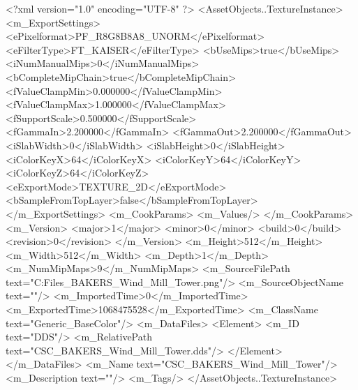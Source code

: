 <?xml version="1.0" encoding="UTF-8" ?>
<AssetObjects..TextureInstance>
	<m_ExportSettings>
		<ePixelformat>PF_R8G8B8A8_UNORM</ePixelformat>
		<eFilterType>FT_KAISER</eFilterType>
		<bUseMips>true</bUseMips>
		<iNumManualMips>0</iNumManualMips>
		<bCompleteMipChain>true</bCompleteMipChain>
		<fValueClampMin>0.000000</fValueClampMin>
		<fValueClampMax>1.000000</fValueClampMax>
		<fSupportScale>0.500000</fSupportScale>
		<fGammaIn>2.200000</fGammaIn>
		<fGammaOut>2.200000</fGammaOut>
		<iSlabWidth>0</iSlabWidth>
		<iSlabHeight>0</iSlabHeight>
		<iColorKeyX>64</iColorKeyX>
		<iColorKeyY>64</iColorKeyY>
		<iColorKeyZ>64</iColorKeyZ>
		<eExportMode>TEXTURE_2D</eExportMode>
		<bSampleFromTopLayer>false</bSampleFromTopLayer>
	</m_ExportSettings>
	<m_CookParams>
		<m_Values/>
	</m_CookParams>
	<m_Version>
		<major>1</major>
		<minor>0</minor>
		<build>0</build>
		<revision>0</revision>
	</m_Version>
	<m_Height>512</m_Height>
	<m_Width>512</m_Width>
	<m_Depth>1</m_Depth>
	<m_NumMipMaps>9</m_NumMipMaps>
	<m_SourceFilePath text="C:\Users\Shadow\Desktop\Working Files\Textures\CSC_BAKERS_Wind_Mill_Tower.png"/>
	<m_SourceObjectName text=""/>
	<m_ImportedTime>0</m_ImportedTime>
	<m_ExportedTime>1068475528</m_ExportedTime>
	<m_ClassName text="Generic_BaseColor"/>
	<m_DataFiles>
		<Element>
			<m_ID text="DDS"/>
			<m_RelativePath text="CSC_BAKERS_Wind_Mill_Tower.dds"/>
		</Element>
	</m_DataFiles>
	<m_Name text="CSC_BAKERS_Wind_Mill_Tower"/>
	<m_Description text=""/>
	<m_Tags/>
</AssetObjects..TextureInstance>


